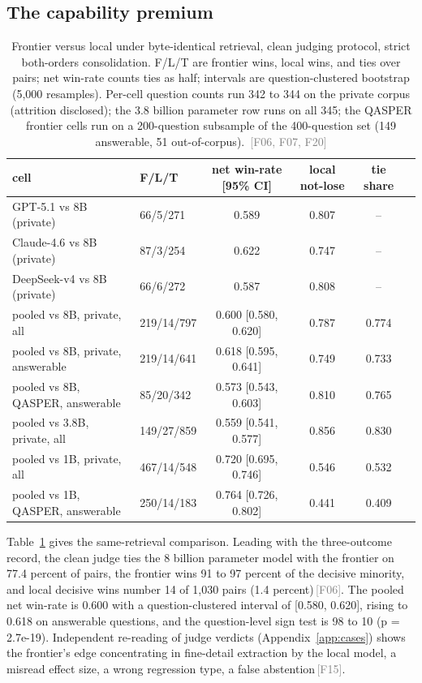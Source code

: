 \documentclass[11pt]{article}
\newcommand{\rcpt}[1]{\textcolor{gray}{\,\textsf{\scriptsize[#1]}}}
\begin{document}
\subsection{The capability premium}
\label{sec:premium}

\begin{table}[tbp]
  \centering
  \small
  \caption{Frontier versus local under byte-identical retrieval, clean judging protocol, strict both-orders consolidation. F/L/T are frontier wins, local wins, and ties over pairs; net win-rate counts ties as half; intervals are question-clustered bootstrap (5{,}000 resamples). Per-cell question counts run 342 to 344 on the private corpus (attrition disclosed); the 3.8 billion parameter row runs on all 345; the QASPER frontier cells run on a 200-question subsample of the 400-question set (149 answerable, 51 out-of-corpus). \rcpt{F06, F07, F20}}
  \label{tab:frontier}
  \begin{tabular}{llcccc}
    \toprule
    cell & F/L/T & net win-rate [95\% CI] & local not-lose & tie share \\
    \midrule
    GPT-5.1 vs 8B (private)      & 66/5/271  & 0.589 & 0.807 & -- \\
    Claude-4.6 vs 8B (private)   & 87/3/254  & 0.622 & 0.747 & -- \\
    DeepSeek-v4 vs 8B (private)  & 66/6/272  & 0.587 & 0.808 & -- \\
    \midrule
    pooled vs 8B, private, all       & 219/14/797 & 0.600 [0.580, 0.620] & 0.787 & 0.774 \\
    pooled vs 8B, private, answerable & 219/14/641 & 0.618 [0.595, 0.641] & 0.749 & 0.733 \\
    pooled vs 8B, QASPER, answerable & 85/20/342  & 0.573 [0.543, 0.603] & 0.810 & 0.765 \\
    pooled vs 3.8B, private, all     & 149/27/859 & 0.559 [0.541, 0.577] & 0.856 & 0.830 \\
    pooled vs 1B, private, all       & 467/14/548 & 0.720 [0.695, 0.746] & 0.546 & 0.532 \\
    pooled vs 1B, QASPER, answerable & 250/14/183 & 0.764 [0.726, 0.802] & 0.441 & 0.409 \\
    \bottomrule
  \end{tabular}
\end{table}

Table~\ref{tab:frontier} gives the same-retrieval comparison. Leading with the three-outcome record, the clean judge ties the 8 billion parameter model with the frontier on 77.4 percent of pairs, the frontier wins 91 to 97 percent of the decisive minority, and local decisive wins number 14 of 1{,}030 pairs (1.4 percent)\rcpt{F06}. The pooled net win-rate is 0.600 with a question-clustered interval of [0.580, 0.620], rising to 0.618 on answerable questions, and the question-level sign test is 98 to 10 (p = 2.7e-19). Independent re-reading of judge verdicts (Appendix~\ref{app:cases}) shows the frontier's edge concentrating in fine-detail extraction by the local model, a misread effect size, a wrong regression type, a false abstention\rcpt{F15}.
\end{document}
